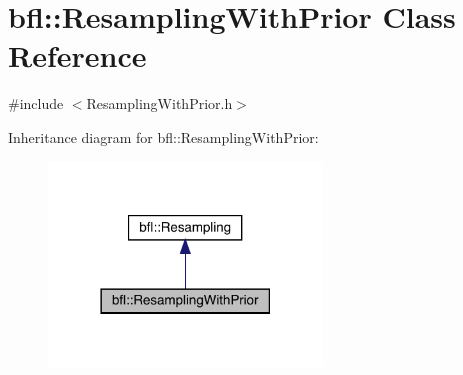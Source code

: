 \hypertarget{classbfl_1_1ResamplingWithPrior}{}\section{bfl\+:\+:Resampling\+With\+Prior Class Reference}
\label{classbfl_1_1ResamplingWithPrior}


{\ttfamily \#include $<$Resampling\+With\+Prior.\+h$>$}



Inheritance diagram for bfl\+:\+:Resampling\+With\+Prior\+:
\nopagebreak
\begin{figure}[H]
\begin{center}
\leavevmode
\includegraphics[width=206pt]{classbfl_1_1ResamplingWithPrior__inherit__graph}
\end{center}
\end{figure}
